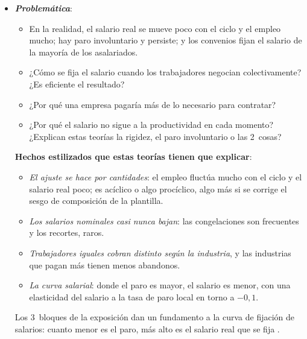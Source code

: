 \documentclass[11pt]{article}
\begin{document}
\begin{itemize}
\item \textbf{\emph{Problemática}}:
  \begin{itemize}
  \item En la realidad, el salario real se mueve poco con el ciclo y el empleo mucho; hay paro involuntario y persiste; y los convenios fijan el salario de la mayoría de los asalariados.
  \item ¿Cómo se fija el salario cuando los trabajadores negocian colectivamente? ¿Es eficiente el resultado?
  \item ¿Por qué una empresa pagaría más de lo necesario para contratar?
  \item ¿Por qué el salario no sigue a la productividad en cada momento? ¿Explican estas teorías la rigidez, el paro involuntario o las 2~cosas?
  \end{itemize}
  \begin{anotaciones}
  \textbf{Hechos estilizados que estas teorías tienen que explicar}\nocite{Romer2019Advanced}:
  \begin{itemize}
  \item \emph{El ajuste se hace por cantidades}: el empleo fluctúa mucho con el ciclo y el salario real poco; es acíclico o algo procíclico, algo más si se corrige el sesgo de composición de la plantilla\nocite{SolonBarskyParker1994Measuring}.
  \item \emph{Los salarios nominales casi nunca bajan}: las congelaciones son frecuentes y los recortes, raros\nocite{DickensEtAl2007How}.
  \item \emph{Trabajadores iguales cobran distinto según la industria}, y las industrias que pagan más tienen menos abandonos\nocite{KruegerSummers1988Efficiency}.
  \item \emph{La curva salarial}: donde el paro es mayor, el salario es menor, con una elasticidad del salario a la tasa de paro local en torno a $-0{,}1$\nocite{BlanchflowerOswald1994Wage}.
  \end{itemize}
  Los 3~bloques de la exposición dan un fundamento a la curva de fijación de salarios: cuanto menor es el paro, más alto es el salario real que se fija .
  \end{anotaciones}


\end{itemize}
\end{document}
